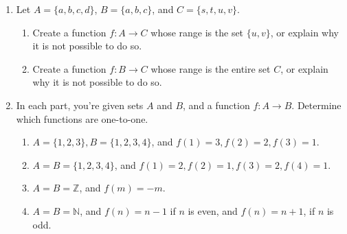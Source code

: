 \documentclass[12pt]{article}
\newcommand{\points}[1]{\marginpar{\hspace{24pt}[#1]}}
\newcommand{\Z}{\mathbb{Z}}
\newcommand{\N}{\mathbb{N}}
\begin{document}
\thispagestyle{fancy}

 \begin{enumerate}
 \item Let $A=\{a,b,c,d\}$, $B=\{a,b,c\}$, and $C=\{s,t,u,v\}$.
\begin{enumerate}
 \item Create a function $f:A\to C$ whose range is the set $\{u,v\}$, or explain why it is not possible to do so. \points{2}

\vspace{4in}

 \item Create a function $f:B\to C$ whose range is the entire set $C$, or explain why it is not possible to do so. \points{2}
\end{enumerate}
\newpage
\item In each part, you're given sets $A$ and $B$, and a function $f:A\to B$. Determine which functions are one-to-one.
\begin{enumerate}
 \item $A=\{1,2,3\}, B=\{1,2,3,4\}$, and $f(1)=3, f(2)=2, f(3)=1$.\points{1}

\vspace{1.5in}

 \item $A=B=\{1,2,3,4\}$, and $f(1)=2, f(2)=1, f(3)=2, f(4)=1$.\points{1}

\vspace{1.5in}

 \item $A=B=\Z$, and $f(m)=-m$.\points{2}

\vspace{2in}

 \item $A=B=\N$, and $f(n)=n-1$ if $n$ is even, and $f(n)=n+1$, if $n$ is odd.\points{2}

\end{enumerate}
 \end{enumerate}
\end{document}
